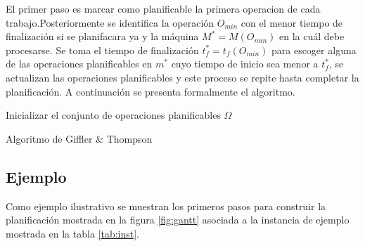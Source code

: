El primer paso es marcar como planificable la primera operacion de cada trabajo.Posteriormente se identifica la operación $O_{min}$ con el menor tiempo de finalización si se planifacara ya y la máquina $M^*=M(O_{min})$ en la cuál debe procesarse. Se toma el tiempo de finalización $t^*_f = t_f(O_{min})$ para escoger alguna de las operaciones planificables en $m^*$ cuyo tiempo de inicio sea menor a $t^*_f$, se actualizan las operaciones planificables y este proceso se repite hasta completar la planificación. A continuación se presenta formalmente el algoritmo.\\ 


\begin{algorithm}[H]
 Inicializar el conjunto de operaciones planificables $\Omega$\;
    \label{alg:GT}
    \caption{Algoritmo de Giffler \& Thompson}
\end{algorithm}
\subsection*{Ejemplo}
Como ejemplo ilustrativo se muestran los primeros pasos para construir la planificación mostrada en la figura \ref{fig:gantt} asociada a la instancia de ejemplo mostrada en la tabla \ref{tab:inst}.\\

